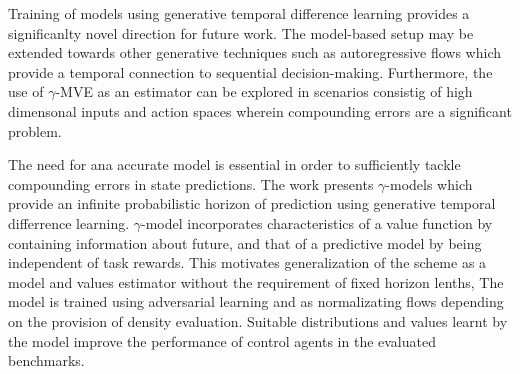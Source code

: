 \documentclass[11pt,letterpaper]{article}
\begin{document}
Training of models using generative temporal difference learning provides a significanlty novel direction for future work. The model-based setup may be extended towards other generative techniques such as autoregressive flows which provide a temporal connection to sequential decision-making. Furthermore, the use of $\gamma$-MVE as an estimator can be explored in scenarios consistig of high dimensonal inputs and action spaces wherein compounding errors are a significant problem. 

The need for ana accurate model is essential in order to sufficiently tackle compounding errors in state predictions. The work presents $\gamma$-models which provide an infinite probabilistic horizon of prediction using generative temporal differrence learning. $\gamma$-model incorporates characteristics of a value function by containing information about future, and that of a predictive model by being independent of task rewards. This motivates generalization of the scheme as a model and values estimator without the requirement of fixed horizon lenths, The model is trained using adversarial learning and as normalizating flows depending on the provision of density evaluation. Suitable distributions and values learnt by the model improve the performance of control agents in the evaluated benchmarks.
\end{document}
